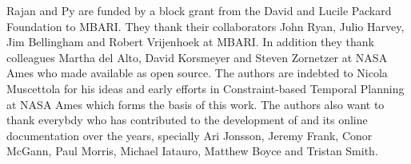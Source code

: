\documentclass[graybox,12pt]{svmult}
\begin{document}
Rajan and Py are funded by a block grant from the David and Lucile
Packard Foundation to MBARI. They thank their collaborators John Ryan,
Julio Harvey, Jim Bellingham and Robert Vrijenhoek at MBARI. In
addition they thank colleagues Martha del Alto, David Korsmeyer and
Steven Zornetzer at NASA Ames who made \eu available as open
source. The authors are indebted to Nicola Muscettola for his ideas
and early efforts in Constraint-based Temporal Planning at NASA Ames
which forms the basis of this work.
The authors also want to thank everybdy who has contributed to the 
development of \eu and its online documentation over the years, specially Ari Jonsson, Jeremy Frank, Conor McGann, Paul Morris,
Michael Iatauro, Matthew Boyce and Tristan Smith.




\end{document}
